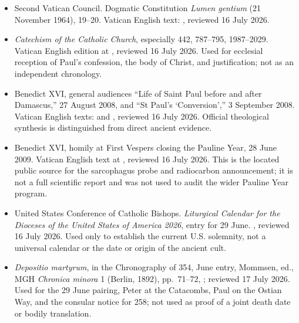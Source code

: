 \begin{itemize}
\item Second Vatican Council. Dogmatic Constitution \emph{Lumen gentium}
  (21 November 1964), 19--20. Vatican English text:
  ,
  reviewed 16 July 2026.

\item \emph{Catechism of the Catholic Church}, especially 442, 787--795,
  1987--2029. Vatican English edition at
  ,
  reviewed 16 July 2026. Used for ecclesial reception of Paul's confession,
  the body of Christ, and justification; not as an independent chronology.

\item Benedict XVI, general audiences ``Life of Saint Paul before and after
  Damascus,'' 27 August 2008, and ``St Paul's `Conversion','' 3 September
  2008. Vatican English texts:
   and
  ,
  reviewed 16 July 2026. Official theological synthesis is distinguished from
  direct ancient evidence.

\item Benedict XVI, homily at First Vespers closing the Pauline Year, 28 June
  2009. Vatican English text at
  ,
  reviewed 16 July 2026. This is the located public source for the sarcophagus
  probe and radiocarbon announcement; it is not a full scientific report and
  was not used to audit the wider Pauline Year program.

\item United States Conference of Catholic Bishops. \emph{Liturgical Calendar
  for the Dioceses of the United States of America 2026}, entry for 29 June.
  ,
  reviewed 16 July 2026. Used only to establish the current U.S. solemnity,
  not a universal calendar or the date or origin of the ancient cult.

\item \emph{Depositio martyrum}, in the Chronography of 354, June entry,
Mommsen, ed., MGH \emph{Chronica minora} 1 (Berlin, 1892), pp.~71--72,
; reviewed 17 July 2026. Used for the 29 June pairing,
Peter at the Catacombs, Paul on the Ostian Way, and the consular notice for
258; not used as proof of a joint death date or bodily translation.


\end{itemize}
